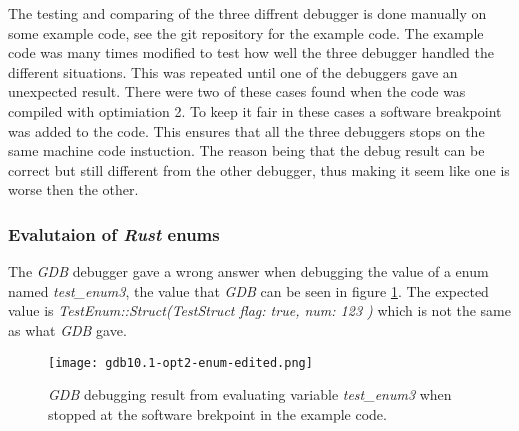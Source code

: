 

The testing and comparing of the three diffrent debugger is done manually on some example code, see the git repository \cite{example-code} for the example code.
The example code was many times modified to test how well the three debugger handled the different situations.
This was repeated until one of the debuggers gave an unexpected result.
There were two of these cases found when the code was compiled with optimiation 2.
To keep it fair in these cases a software breakpoint was added to the code.
This ensures that all the three debuggers stops on the same machine code instuction.
The reason being that the debug result can be correct but still different from the other debugger, thus making it seem like one is worse then the other.


\subsubsection{Evalutaion of \emph{Rust} enums}
The \emph{GDB} debugger gave a wrong answer when debugging the value of a enum named \emph{test\_enum3}, the value that \emph{GDB} can be seen in figure \ref{fig:gdbenum}.
The expected value is \emph{TestEnum::Struct(TestStruct { flag: true, num: 123 })} which is not the same as what \emph{GDB} gave.


\begin{figure}[h]
	\centering
	\texttt{[image: gdb10.1-opt2-enum-edited.png]}
	\caption{\emph{GDB} debugging result from evaluating variable \emph{test\_enum3} when stopped at the software brekpoint in the example code.}
	\label{fig:gdbenum}
\end{figure}


